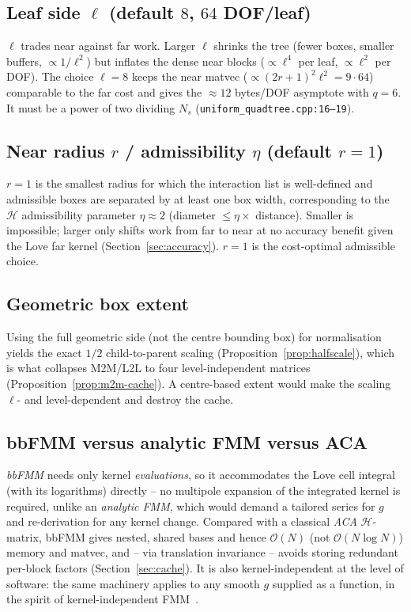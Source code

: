 \documentclass[11pt,a4paper]{article}
\newcommand{\Order}{\mathcal{O}}
\newcommand{\Hmat}{\mathcal{H}}
\newcommand{\code}[1]{\texttt{#1}}
\theoremstyle{definition}
\theoremstyle{remark}
\begin{document}
\subsection{Leaf side $\ell$ (default $8$, $64$ DOF/leaf)}
\label{sec:params-leaf}
$\ell$ trades near against far work. Larger $\ell$ shrinks the tree (fewer boxes,
smaller buffers, $\propto 1/\ell^2$) but inflates the dense near blocks
($\propto\ell^4$ per leaf, $\propto\ell^2$ per DOF). The choice $\ell=8$ keeps
the near matvec ($\propto(2r+1)^2\ell^2 = 9\cdot64$) comparable to the far cost
and gives the $\approx12$ bytes/DOF asymptote with $q=6$. It must be a power of
two dividing $N_s$ (\code{uniform\_quadtree.cpp:16--19}).

\subsection{Near radius $r$ / admissibility $\eta$ (default $r=1$)}
\label{sec:params-eta}
$r=1$ is the smallest radius for which the interaction list is well-defined and
admissible boxes are separated by at least one box width, corresponding to the
$\Hmat$ admissibility parameter $\eta\approx 2$ (diameter $\le \eta\times$
distance). Smaller is impossible; larger only shifts work from far to near at no
accuracy benefit given the Love far kernel (Section~\ref{sec:accuracy}). $r=1$ is
the cost-optimal admissible choice.

\subsection{Geometric box extent}
Using the full geometric side (not the centre bounding box) for normalisation
yields the exact $1/2$ child-to-parent scaling (Proposition~\ref{prop:halfscale}),
which is what collapses M2M/L2L to four level-independent matrices
(Proposition~\ref{prop:m2m-cache}). A centre-based extent would make the scaling
$\ell$- and level-dependent and destroy the cache.

\subsection{bbFMM versus analytic FMM versus ACA}
\emph{bbFMM} needs only kernel \emph{evaluations}, so it accommodates the Love
cell integral (with its logarithms) directly -- no multipole expansion of the
integrated kernel is required, unlike an \emph{analytic FMM}, which would demand
a tailored series for $g$ and re-derivation for any kernel change. Compared with
a classical \emph{ACA} $\Hmat$-matrix, bbFMM gives nested, shared bases and
hence $\Order(N)$ (not $\Order(N\log N)$) memory and matvec, and -- via
translation invariance -- avoids storing redundant per-block factors
(Section~\ref{sec:cache}). It is also kernel-independent at the level of
software: the same machinery applies to any smooth $g$ supplied as a function,
in the spirit of kernel-independent FMM~\cite{Ying2004,FongDarve2009}.
\end{document}
